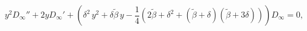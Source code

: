 \begin{equation}
y^2 D_\infty ''+2yD_\infty '+\left(\delta^2\,y^2+\delta\tilde{\beta} \,y-\frac{1}{4} \left(2\tilde{
\beta}+\delta^2+(\tilde{
\beta}+
\delta)(\tilde{ \beta}+3\delta)\right)\right)D_\infty=0,
\end{equation}

